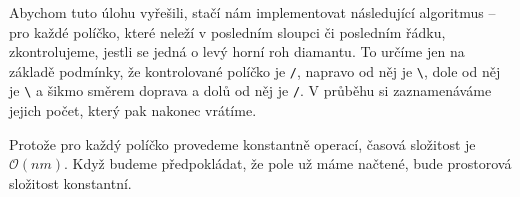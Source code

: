 \documentclass{fkssolpub}
\author{Ondřej Sedláček}
\begin{document}
Abychom tuto úlohu vyřešili, stačí nám implementovat následující algoritmus --
pro každé políčko, které neleží v posledním sloupci či posledním řádku,
zkontrolujeme, jestli se jedná o levý horní roh diamantu. To určíme jen
na základě podmínky, že kontrolované políčko je \verb|/|, napravo od něj
je \verb|\|, dole od něj je \verb|\| a šikmo směrem doprava a dolů od něj
je \verb|/|. V průběhu si zaznamenáváme jejich počet, který pak nakonec vrátíme.

Protože pro každý políčko provedeme konstantně operací, časová složitost je
$\mathcal{O}(n m)$. Když budeme předpokládat, že pole už máme načtené, bude
prostorová složitost konstantní.
\end{document}
